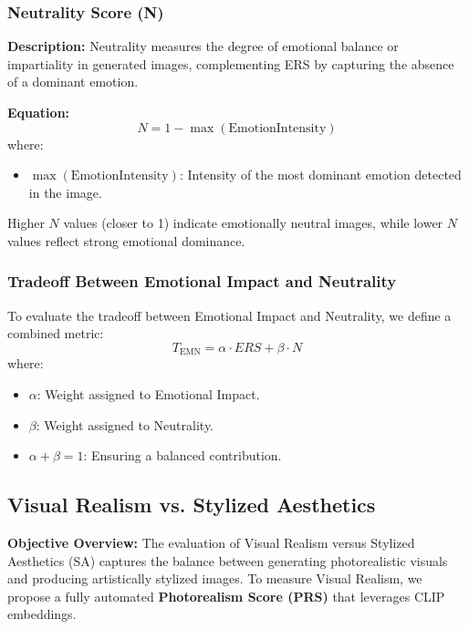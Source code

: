 \subsubsection{Neutrality Score (N)}
\textbf{Description:} Neutrality measures the degree of emotional balance or impartiality in generated images, complementing ERS by capturing the absence of a dominant emotion.

\textbf{Equation:}
\begin{equation}
N = 1 - \max(\text{EmotionIntensity})
\end{equation}
where:
\begin{itemize}
    \item \( \max(\text{EmotionIntensity}) \): Intensity of the most dominant emotion detected in the image.
\end{itemize}

Higher \( N \) values (closer to 1) indicate emotionally neutral images, while lower \( N \) values reflect strong emotional dominance.

\subsubsection{Tradeoff Between Emotional Impact and Neutrality}
To evaluate the tradeoff between Emotional Impact and Neutrality, we define a combined metric:
\begin{equation}
T_{\text{EMN}} = \alpha \cdot ERS + \beta \cdot N
\end{equation}
where:
\begin{itemize}
    \item \( \alpha \): Weight assigned to Emotional Impact.
    \item \( \beta \): Weight assigned to Neutrality.
    \item \( \alpha + \beta = 1 \): Ensuring a balanced contribution.
\end{itemize}

\subsection{Visual Realism vs. Stylized Aesthetics}
\label{subsec:visual_realism_aesthetics}

\textbf{Objective Overview:} 
The evaluation of Visual Realism versus Stylized Aesthetics (SA) captures the balance between generating photorealistic visuals and producing artistically stylized images. To measure Visual Realism, we propose a fully automated \textbf{Photorealism Score (PRS)} that leverages CLIP embeddings.

